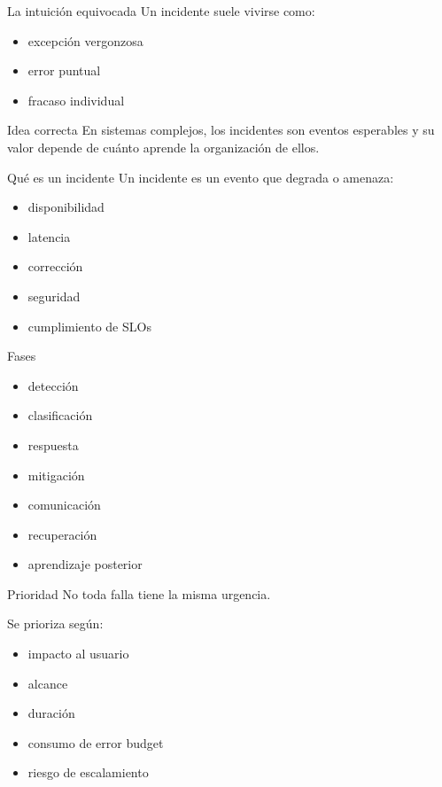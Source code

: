 \documentclass[institutional,screen,none]{ua-engineering-v6-beamer}
\title{\UACourse}
\subtitle{Clase 14 --- Incidentes, postmortems, aprendizaje organizacional y cultura de confiabilidad}
\author{\UAProfessor}
\date{\UADate}
\begin{document}
{
\begin{frame}[plain]
\titlepage
\end{frame}
}


\begin{frame}{La intuición equivocada}
Un incidente suele vivirse como:
\begin{itemize}
\item excepción vergonzosa
\item error puntual
\item fracaso individual
\end{itemize}

\pause

\begin{alertblock}{Idea correcta}
En sistemas complejos, los incidentes son eventos esperables y su valor depende de cuánto aprende la organización de ellos.
\end{alertblock}
\end{frame}

\begin{frame}{Qué es un incidente}
Un incidente es un evento que degrada o amenaza:
\begin{itemize}
\item disponibilidad
\item latencia
\item corrección
\item seguridad
\item cumplimiento de SLOs
\end{itemize}
\end{frame}


\begin{frame}{Fases}
\begin{itemize}
\item detección
\item clasificación
\item respuesta
\item mitigación
\item comunicación
\item recuperación
\item aprendizaje posterior
\end{itemize}
\end{frame}

\begin{frame}{Prioridad}
No toda falla tiene la misma urgencia.

\pause

Se prioriza según:
\begin{itemize}
\item impacto al usuario
\item alcance
\item duración
\item consumo de error budget
\item riesgo de escalamiento
\end{itemize}
\end{frame}
\end{document}
